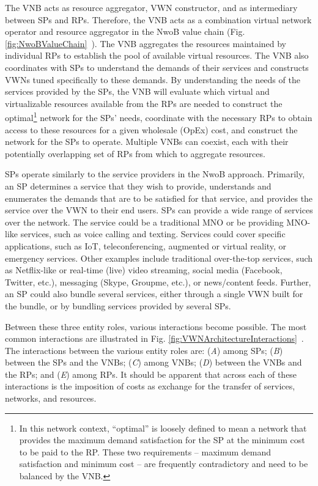 \documentclass[12pt,dvipsnames]{report}
\begin{document}
The VNB acts as resource aggregator, VWN constructor, and as intermediary between SPs and RPs.  Therefore, the VNB acts as a combination virtual network operator and resource aggregator in the NwoB value chain (Fig. \ref{fig:NwoBValueChain}~\cite{6737248}).  The VNB aggregates the resources maintained by individual RPs to establish the pool of available virtual resources.  The VNB also coordinates with SPs to understand the demands of their services and constructs VWNs tuned specifically to these demands.  By understanding the needs of the services provided by the SPs, the VNB will evaluate which virtual and virtualizable resources available from the RPs are needed to construct the optimal\footnote{In this network context, ``optimal'' is loosely defined to mean a network that provides the maximum demand satisfaction for the SP at the minimum cost to be paid to the RP.  These two requirements -- maximum demand satisfaction and minimum cost -- are frequently contradictory and need to be balanced by the VNB.} network for the SPs' needs, coordinate with the necessary RPs to obtain access to these resources for a given wholesale (OpEx) cost, and construct the network for the SPs to operate.  Multiple VNBs can coexist, each with their potentially overlapping set of RPs from which to aggregate resources.

SPs operate similarly to the service providers in the NwoB approach.  Primarily, an SP determines a service that they wish to provide, understands and enumerates the demands that are to be satisfied for that service, and provides the service over the VWN to their end users.  SPs can provide a wide range of services over the network.  The service could be a traditional MNO or be providing MNO-like services, such as voice calling and texting.  Services could cover specific applications, such as IoT, teleconferencing, augmented or virtual reality, or emergency services.  Other examples include traditional over-the-top services, such as Netflix-like or real-time (live) video streaming, social media (Facebook, Twitter, etc.), messaging (Skype, Groupme, etc.), or news/content feeds.  Further, an SP could also bundle several services, either through a single VWN built for the bundle, or by bundling services provided by several SPs.

Between these three entity roles, various interactions become possible.  The most common interactions are illustrated in Fig. \ref{fig:VWNArchitectureInteractions}~\cite{MJ_MECOMM_17}.  The interactions between the various entity roles are: (\emph{A}) among SPs; (\emph{B}) between the SPs and the VNBs; (\emph{C}) among VNBs; (\emph{D}) between the VNBs and the RPs; and (\emph{E}) among RPs.  It should be apparent that across each of these interactions is the imposition of costs as exchange for the transfer of services, networks, and resources.
\end{document}

